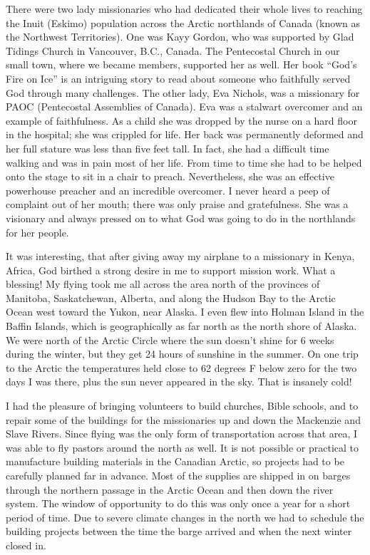 \documentclass[twoside, 12pt]{book}
\begin{document}
There were two lady missionaries who had dedicated their whole lives to reaching the Inuit (Eskimo) population across the Arctic northlands of Canada (known as the Northwest Territories). One was Kayy Gordon, who was supported by Glad Tidings Church in Vancouver, B.C., Canada. The Pentecostal Church in our small town, where we became members, supported her as well. Her book “God's Fire on Ice” is an intriguing story to read about someone who faithfully served God through many challenges. The other lady, Eva Nichols, was a missionary for PAOC (Pentecostal Assemblies of Canada). Eva was a stalwart overcomer and an example of faithfulness. As a child she was dropped by the nurse on a hard floor in the hospital; she was crippled for life. Her back was permanently deformed and her full stature was less than five feet tall. In fact, she had a difficult time walking and was in pain most of her life. From time to time she had to be helped onto the stage to sit in a chair to preach. Nevertheless, she was an effective powerhouse preacher and an incredible overcomer. I never heard a peep of complaint out of her mouth; there was only praise and gratefulness. She was a visionary and always pressed on to what God was going to do in the northlands for her people.

It was interesting, that after giving away my airplane to a missionary in Kenya, Africa, God birthed a strong desire in me to support mission work. What a blessing! My flying took me all across the area north of the provinces of Manitoba, Saskatchewan, Alberta, and along the Hudson Bay to the Arctic Ocean west toward the Yukon, near Alaska. I even flew into Holman Island in the Baffin Islands, which is geographically as far north as the north shore of Alaska. We were north of the Arctic Circle where the sun doesn't shine for 6 weeks during the winter, but they get 24 hours of sunshine in the summer. On one trip to the Arctic the temperatures held close to 62 degrees F below zero for the two days I was there, plus the sun never appeared in the sky. That is insanely cold!

I had the pleasure of bringing volunteers to build churches, Bible schools, and to repair some of the buildings for the missionaries up and down the Mackenzie and Slave Rivers. Since flying was the only form of transportation across that area, I was able to fly pastors around the north as well. It is not possible or practical to manufacture building materials in the Canadian Arctic, so projects had to be carefully planned far in advance. Most of the supplies are shipped in on barges through the northern passage in the Arctic Ocean and then down the river system. The window of opportunity to do this was only once a year for a short period of time. Due to severe climate changes in the north we had to schedule the building projects between the time the barge arrived and when the next winter closed in.
\end{document}
